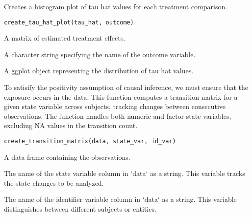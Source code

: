 \documentclass[a4paper]{book}
\begin{document}
%
\begin{Description}
Creates a histogram plot of tau hat values for each treatment comparison.
\end{Description}
%
\begin{Usage}
\begin{verbatim}
create_tau_hat_plot(tau_hat, outcome)
\end{verbatim}
\end{Usage}
%
\begin{Arguments}
\begin{ldescription}
\item[\code{tau\_hat}] A matrix of estimated treatment effects.

\item[\code{outcome}] A character string specifying the name of the outcome variable.
\end{ldescription}
\end{Arguments}
%
\begin{Value}
A ggplot object representing the distribution of tau hat values.
\end{Value}
%
\begin{Description}
To satisify the positivity assumption of causal inference, we must ensure that the exposure occurs in the data. This function computes a transition matrix for a given state variable across subjects, tracking changes between consecutive observations. The function handles both numeric and factor state variables, excluding NA values in the transition count.
\end{Description}
%
\begin{Usage}
\begin{verbatim}
create_transition_matrix(data, state_var, id_var)
\end{verbatim}
\end{Usage}
%
\begin{Arguments}
\begin{ldescription}
\item[\code{data}] A data frame containing the observations.

\item[\code{state\_var}] The name of the state variable column in `data` as a string. This variable tracks the state changes to be analyzed.

\item[\code{id\_var}] The name of the identifier variable column in `data` as a string. This variable distinguishes between different subjects or entities.
\end{ldescription}
\end{Arguments}
\end{document}

